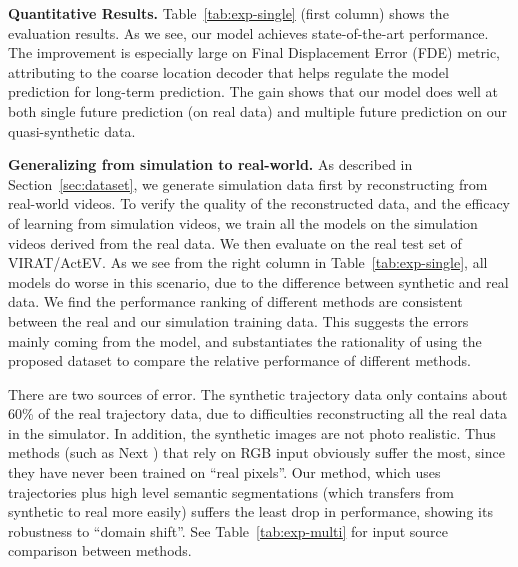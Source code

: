 \documentclass[10pt,twocolumn,letterpaper]{article}
\begin{document}
\noindent\textbf{Quantitative Results.} 
Table~\ref{tab:exp-single} (first column)
shows the evaluation results. 
As we see, our model achieves state-of-the-art performance.
The improvement is especially large on Final Displacement Error (FDE) metric, attributing to the coarse location decoder that helps regulate the model prediction for long-term prediction.
The gain shows that our model does well at both
single future prediction (on real data)
and multiple future prediction on our quasi-synthetic data.


\noindent\textbf{Generalizing from simulation to real-world.} As described in Section~\ref{sec:dataset}, we generate simulation data first by reconstructing from real-world videos.
To verify the quality of the reconstructed data,
and the efficacy of learning from simulation videos, we train 
all the models on the simulation videos 
derived from the real data.
We then evaluate on the real test set of VIRAT/ActEV.
As we see from the right column in Table~\ref{tab:exp-single},
all models do worse in this scenario,
due to the difference between synthetic and real data.
We find  the  performance  ranking  of  different  methods  are consistent between the real and our simulation training data.  This suggests the errors mainly coming from the model,  and  substantiates  the  rationality  of  using  the  proposed dataset to compare the relative performance of different methods.

There are two sources of error.
The synthetic trajectory data only contains about 60\%
of the real trajectory data, due to difficulties
reconstructing all the real data in the simulator.
In addition, the synthetic images are
not photo realistic.
Thus
methods (such as Next \cite{liang2019peeking})
that rely on RGB input obviously suffer the most,
since they have never been trained on ``real pixels''.
Our method, which uses trajectories plus high level
semantic segmentations (which transfers from synthetic
to real more easily)
suffers the least drop in performance,
showing its robustness to ``domain shift''. See Table~\ref{tab:exp-multi} for input source comparison between methods.
\end{document}
